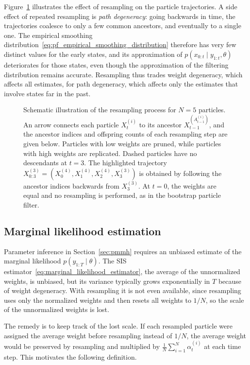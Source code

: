 Figure~\ref{fig:resampling} illustrates the effect of resampling on the particle trajectories. A side effect of repeated resampling is \emph{path degeneracy}: going backwards in time, the trajectories coalesce to only a few common ancestors, and eventually to a single one. The empirical smoothing distribution~\eqref{eq:pf_empirical_smoothing_distribution} therefore has very few distinct values for the early states, and its approximation of $p(x_{0:t}\mid y_{1:t},\theta)$ deteriorates for those states, even though the approximation of the filtering distribution remains accurate. Resampling thus trades weight degeneracy, which affects all estimates, for path degeneracy, which affects only the estimates that involve states far in the past.
\begin{figure}
    \centering
    \resizebox{0.8\textwidth}{!}{
        
    }
    \caption{Schematic illustration of the resampling process for $N=5$ particles. An arrow connects each particle $X_t^{(i)}$ to its ancestor $X_{t-1}^{(A_{t-1}^{(i)})}$, and the ancestor indices and offspring counts of each resampling step are given below. Particles with low weights are pruned, while particles with high weights are replicated. Dashed particles have no descendants at $t=3$. The highlighted trajectory $X_{0:3}^{(3)} = (X_0^{(4)},X_1^{(4)},X_2^{(4)},X_3^{(3)})$ is obtained by following the ancestor indices backwards from $X_3^{(3)}$. At $t=0$, the weights are equal and no resampling is performed, as in the bootstrap particle filter.}
    \label{fig:resampling}
\end{figure}

\subsection{Marginal likelihood estimation}
\label{sec:pf_marginal_likelihood}
Parameter inference in Section~\ref{sec:pmmh} requires an unbiased estimate of the marginal likelihood $p(y_{1:T}\mid\theta)$. The SIS estimator~\eqref{eq:marginal_likelihood_estimator}, the average of the unnormalized weights, is unbiased, but its variance typically grows exponentially in $T$ because of weight degeneracy. With resampling it is not even available, since resampling uses only the normalized weights and then resets all weights to $1/N$, so the scale of the unnormalized weights is lost.

The remedy is to keep track of the lost scale. If each resampled particle were assigned the average weight before resampling instead of $1/N$, the average weight would be preserved by resampling and multiplied by $\frac{1}{N}\sum_{i=1}^{N}\alpha_{t}^{(i)}$ at each time step. This motivates the following definition.


